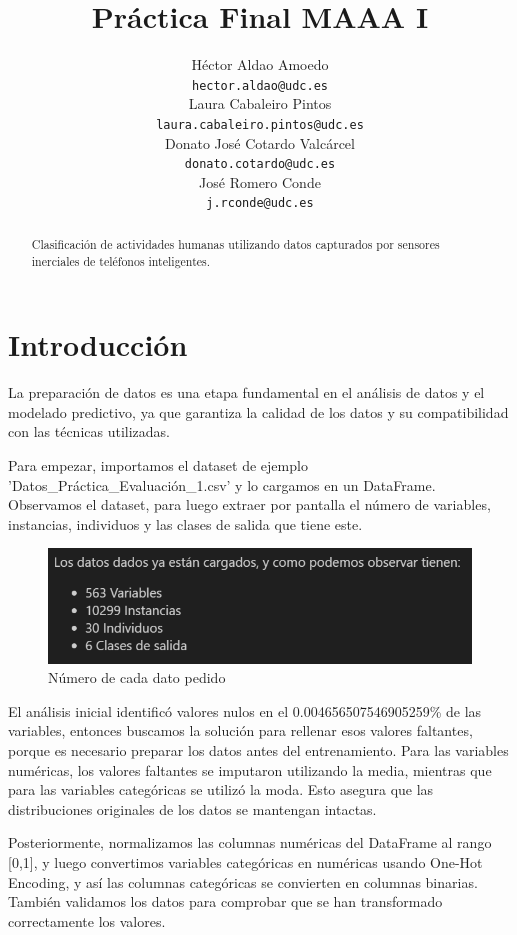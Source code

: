 \documentclass{article}
\title{Práctica Final MAAA I}
\author{
	\AND
	Héctor Aldao Amoedo\\
	\texttt{hector.aldao@udc.es}\\  
	\And
	Laura Cabaleiro Pintos\\
	\texttt{laura.cabaleiro.pintos@udc.es}\\
	\And
	Donato José Cotardo Valcárcel \\
	\texttt{donato.cotardo@udc.es}\\
	\And
	José Romero Conde\\
	\texttt{j.rconde@udc.es}\\
	\And  
}
\begin{document}
	
	
	\maketitle
	
	\begin{abstract}
		
		Clasificación de actividades humanas utilizando datos capturados por sensores inerciales de teléfonos inteligentes.
		
	\end{abstract}
	
	\section{Introducción}
	
La preparación de datos es una etapa fundamental en el análisis de datos y el modelado predictivo, ya que garantiza la calidad de los datos y su compatibilidad con las técnicas utilizadas.

Para empezar, importamos el dataset de ejemplo 'Datos\_Práctica\_Evaluación\_1.csv' y lo cargamos en un DataFrame. Observamos el dataset, para luego extraer por pantalla el número de variables, instancias, individuos y las clases de salida que tiene este.

\begin{figure}[h]
    \centering
    \includegraphics[width=0.75\linewidth]{images/datos.png}
    \caption{Número de cada dato pedido}
    \label{fig:enter-label}
\end{figure}

El análisis inicial identificó valores nulos en el 0.004656507546905259\% de las variables, entonces buscamos la solución para rellenar esos valores faltantes, porque es necesario preparar los datos antes del entrenamiento. Para las variables numéricas, los valores faltantes se imputaron utilizando la media, mientras que para las variables categóricas se utilizó la moda. Esto asegura que las distribuciones originales de los datos se mantengan intactas.

Posteriormente, normalizamos las columnas numéricas del DataFrame al rango [0,1], y luego convertimos variables categóricas en numéricas usando One-Hot Encoding, y así las columnas categóricas se convierten en columnas binarias. También validamos los datos para comprobar que se han transformado correctamente los valores.
\end{document}
